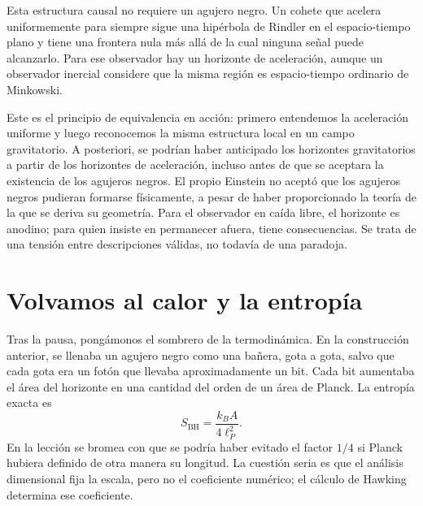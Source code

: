 Esta estructura causal no requiere un agujero negro. Un cohete que acelera uniformemente para siempre sigue una hipérbola de Rindler en el espacio-tiempo plano y tiene una frontera nula más allá de la cual ninguna señal puede alcanzarlo. Para ese observador hay un horizonte de aceleración, aunque un observador inercial considere que la misma región es espacio-tiempo ordinario de Minkowski.

\begin{classroomqa}
\end{classroomqa}

Este es el principio de equivalencia en acción: primero entendemos la aceleración uniforme y luego reconocemos la misma estructura local en un campo gravitatorio. A posteriori, se podrían haber anticipado los horizontes gravitatorios a partir de los horizontes de aceleración, incluso antes de que se aceptara la existencia de los agujeros negros. El propio Einstein no aceptó que los agujeros negros pudieran formarse físicamente, a pesar de haber proporcionado la teoría de la que se deriva su geometría. Para el observador en caída libre, el horizonte es anodino; para quien insiste en permanecer afuera, tiene consecuencias. Se trata de una tensión entre descripciones válidas, no todavía de una paradoja.

\section{Volvamos al calor y la entropía}

Tras la pausa, pongámonos el sombrero de la termodinámica. En la construcción anterior, se llenaba un agujero negro como una bañera, gota a gota, salvo que cada gota era un fotón que llevaba aproximadamente un bit. Cada bit aumentaba el área del horizonte en una cantidad del orden de un área de Planck. La entropía exacta es
\begin{equation}
S_{\mathrm{BH}}=\frac{k_B A}{4\ell_P^2}.
\end{equation}
En la lección se bromea con que se podría haber evitado el factor \(1/4\) si Planck hubiera definido de otra manera su longitud. La cuestión seria es que el análisis dimensional fija la escala, pero no el coeficiente numérico; el cálculo de Hawking determina ese coeficiente.

